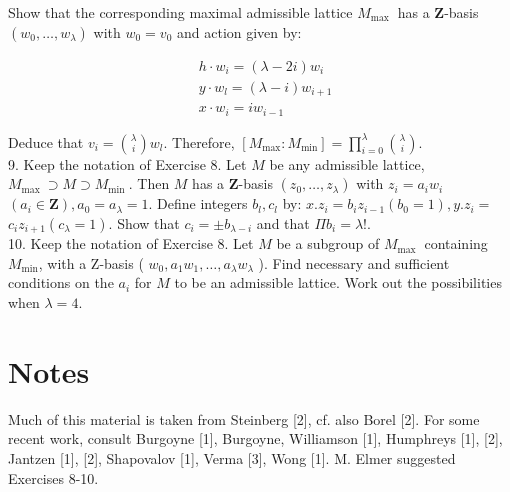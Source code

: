 \documentclass[10pt]{article}
\begin{document}
Show that the corresponding maximal admissible lattice $M_{\text {max }}$ has a $\mathbf{Z}$-basis $\left(w_{0}, \ldots, w_{\lambda}\right)$ with $w_{0}=v_{0}$ and action given by:

$$
\begin{aligned}
& h \cdot w_{i}=(\lambda-2 i) w_{i} \\
& y \cdot w_{l}=(\lambda-i) w_{i+1} \\
& x \cdot w_{i}=i w_{i-1}
\end{aligned}
$$

Deduce that $v_{i}=\binom{\lambda}{i} w_{l}$. Therefore, $\left[M_{\max }: M_{\min }\right]=\prod_{i=0}^{\lambda}\binom{\lambda}{i}$.\\
9. Keep the notation of Exercise 8. Let $M$ be any admissible lattice, $M_{\text {max }} \supset M \supset M_{\text {min }}$. Then $M$ has a $\mathbf{Z}$-basis $\left(z_{0}, \ldots, z_{\lambda}\right)$ with $z_{i}=a_{i} w_{i}$ $\left(a_{i} \in \mathbf{Z}\right), a_{0}=a_{\lambda}=1$. Define integers $b_{l}, c_{l}$ by: $x . z_{i}=b_{i} z_{i-1}\left(b_{0}=1\right), y . z_{i}=$ $c_{i} z_{i+1}\left(c_{\lambda}=1\right)$. Show that $c_{i}= \pm b_{\lambda-i}$ and that $\Pi b_{i}=\lambda!$.\\
10. Keep the notation of Exercise 8. Let $M$ be a subgroup of $M_{\text {max }}$ containing $M_{\min }$, with a Z-basis ( $w_{0}, a_{1} w_{1}, \ldots, a_{\lambda} w_{\lambda}$ ). Find necessary and sufficient conditions on the $a_{i}$ for $M$ to be an admissible lattice. Work out the possibilities when $\lambda=4$.

\section*{Notes}
Much of this material is taken from Steinberg [2], cf. also Borel [2]. For some recent work, consult Burgoyne [1], Burgoyne, Williamson [1], Humphreys [1], [2], Jantzen [1], [2], Shapovalov [1], Verma [3], Wong [1]. M. Elmer suggested Exercises 8-10.
\end{document}
